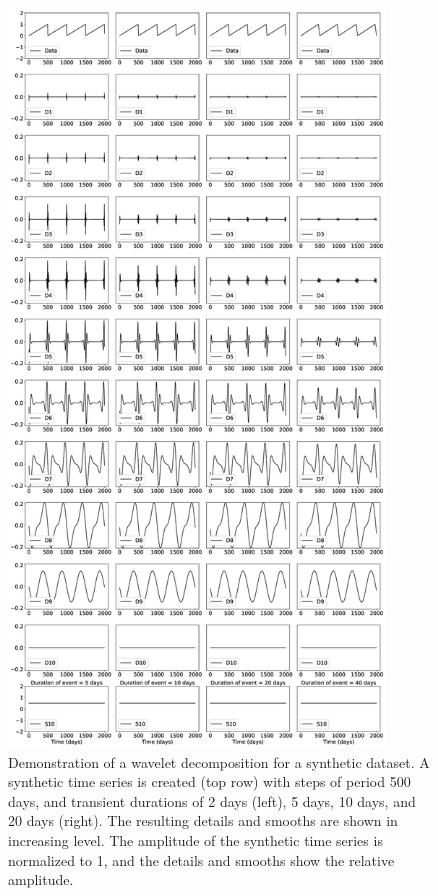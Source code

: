 \documentclass{article}
\begin{document}
\begin{figure}
\noindent\includegraphics[width=10cm, trim={0cm 0cm 0cm 0cm},clip]{figures/500_DS.eps}
\caption{Demonstration of a wavelet decomposition for a synthetic dataset. A synthetic time series is created (top row) with steps of period 500 days, and transient durations of 2 days (left), 5 days, 10 days, and 20 days (right). The resulting details and smooths are shown in increasing level. The amplitude of the synthetic time series is normalized to 1, and the details and smooths show the relative amplitude.}
\label{pngfiguresample}
\end{figure}
\end{document}
